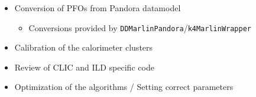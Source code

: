 \documentclass[aspectratio=169]{beamer}
\begin{document}
\begin{frame}
  \begin{itemize}\scriptsize
      \item Conversion of PFOs from Pandora datamodel
          \begin{itemize}\setlength{\itemsep}{.5ex}\scriptsize
            \item Conversions provided by
                  \texttt{DDMarlinPandora}/\texttt{k4MarlinWrapper}
          \end{itemize}
      \item Calibration of the calorimeter clusters
      \item Review of CLIC and ILD specific code
      \item Optimization of the algorithms / Setting correct parameters
  \end{itemize}
\end{frame}
\end{document}
